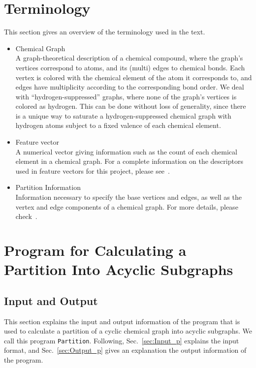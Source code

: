 \documentclass[11pt,titlepage,dvipdfmx,twoside]{book}
\begin{document}
\section{Terminology}
\label{sec:term}

This section gives an overview of the terminology used in the text.
%
\begin{itemize}
%
\item Chemical Graph\\
A graph-theoretical description of a chemical compound, 
where the graph's vertices correspond to atoms, and
its (multi) edges to chemical bonds.
Each vertex is colored with the chemical element of the atom it corresponds to,
and edges have multiplicity according to the corresponding bond order.
We deal with ``hydrogen-suppressed'' graphs, 
where none of the graph's vertices is colored as hydrogen.
This can be done without loss of generality,
since there is a unique way to saturate a hydrogen-suppressed chemical graph 
with hydrogen atoms subject to a fixed valence of each chemical element.


\item Feature vector\\
A numerical vector giving information such as the count of
each chemical element in a chemical graph.
For a complete information on the descriptors used in feature vectors for
this project, please see~\cite{AN20}.



\item Partition Information\\
Information necessary to specify the base vertices and edges, as well as the vertex and edge components
of a chemical graph.
For more details, please check~\cite{AN20}.
\end{itemize}


\section{Program for Calculating a Partition Into Acyclic Subgraphs}
\label{sec: partition}

\subsection{Input and Output}
\label{sec:InOut_p}

This section explains the input and output information of the 
program that is used to calculate a partition of a cyclic chemical graph
into acyclic subgraphs.
We call this program {\tt Partition}.
Following,
Sec.~\ref{sec:Input_p} explains the input format, and
Sec.~\ref{sec:Output_p} gives an explanation the output information of the program.
\end{document}
